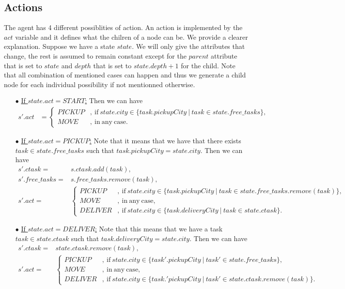 \documentclass[11pt]{article}
\begin{document}
\subsection{Actions}
The agent has 4 different possiblities of action. An action is implemented by the $act$ variable and it defines what the chilren of a node can be. We provide a clearer explanation. Suppose we have a state $state$. We will only give the attributes that change, the rest is assumed to remain constant except for the $parent$ attribute that is set to $state$ and $depth$ that is set to $state.depth+1$ for the child. Note that all combination of mentioned cases can happen and thus we generate a child node for each individual possibility if not mentionned otherwise.
\begin{itemize}
	\item[$\bullet$] \underline{If $state.act=START$:} Then we can have 
		\begin{align*}
			s'.act &= \begin{cases}
					 PICKUP &,\ \mathrm{if}\ state.city\in\{task.pickupCity\ |\ task\in state.free\_tasks\},\\
					 MOVE &,\ \mathrm{in\ any\ case}.
				       \end{cases}
		\end{align*}
		
	\item[$\bullet$] \underline{If $state.act=PICKUP$:} Note that it means that we have that there exists $task\in state.free\_tasks$ such that $task.pickupCity=state.city$. Then we can have 
		\begin{align*}
			s'.ctask =& s.ctask.add(task),\\
			s'.free\_tasks =& s.free\_tasks.remove(task),\\
			s'.act =& \begin{cases}
						PICKUP &,\ \mathrm{if}\ state.city\in\{task.pickupCity\ |\ task\in state.free\_tasks.remove(task)\},\\
						MOVE &,\ \mathrm{in\ any\ case},\\
						DELIVER &,\ \mathrm{if}\ state.city\in\{task.deliveryCity\ |\ task\in state.ctask\}.
					\end{cases}
		\end{align*}
	
	\item[$\bullet$] \underline{If $state.act=DELIVER$:} Note that this means that we have a task $task\in state.ctask$ such that $task.deliveryCity = state.city$. Then we can have
		\begin{align*}
			s'.ctask =& state.ctask.remove(task),\\
			s'.act =& \begin{cases}
						PICKUP &,\ \mathrm{if}\ state.city\in\{task'.pickupCity\ |\  task'\in state.free\_tasks\},\\
						MOVE &,\ \mathrm{in\ any\ case},\\
						DELIVER &,\ \mathrm{if}\ state.city\in\{task.'pickupCity\ |\ task'\in state.ctask.remove(task)\}.
					\end{cases}
		\end{align*}
		

\end{itemize}
\end{document}
